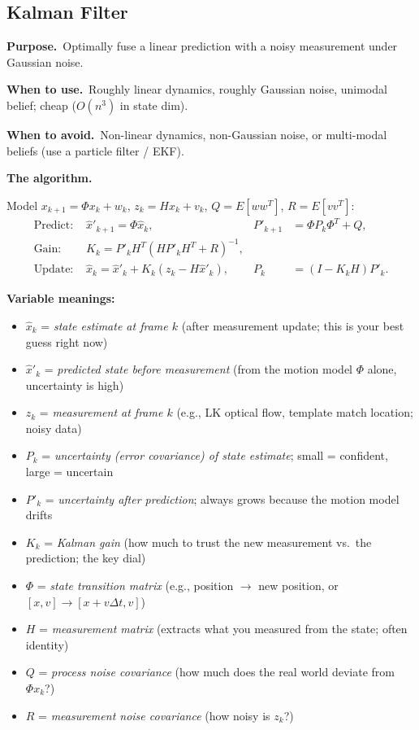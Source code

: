\documentclass[10pt]{article}
\newcommand{\Purpose}{\par\smallskip\textbf{Purpose.}\ }
\newcommand{\WhenUse}{\par\textbf{When to use.}\ }
\newcommand{\WhenAvoid}{\par\textbf{When to avoid.}\ }
\newcommand{\TheAlgo}{\par\smallskip\textbf{The algorithm.}\par\nopagebreak}
\begin{document}
\subsection{Kalman Filter}\label{sub:kalman}
\Purpose Optimally fuse a linear prediction with a noisy measurement under Gaussian noise.
\WhenUse Roughly linear dynamics, roughly Gaussian noise, unimodal belief; cheap ($O(n^3)$ in state dim).
\WhenAvoid Non-linear dynamics, non-Gaussian noise, or multi-modal beliefs (use a particle filter / EKF).
\TheAlgo Model $x_{k+1}=\Phi x_k+w_k$, $z_k=Hx_k+v_k$, $Q=E[ww^T]$, $R=E[vv^T]$:
\begin{align*}
\text{Predict: } &\hat x'_{k+1}=\Phi\hat x_k, & P'_{k+1}&=\Phi P_k\Phi^T+Q,\\
\text{Gain: } &K_k=P'_kH^T(HP'_kH^T+R)^{-1}, &&\\
\text{Update: } &\hat x_k=\hat x'_k+K_k(z_k-H\hat x'_k), & P_k&=(I-K_kH)P'_k .
\end{align*}

\textbf{Variable meanings:}
\begin{itemize}[noitemsep]
  \item $\hat x_k$ = \textit{state estimate at frame $k$} (after measurement update; this is your best guess right now)
  \item $\hat x'_k$ = \textit{predicted state before measurement} (from the motion model $\Phi$ alone, uncertainty is high)
  \item $z_k$ = \textit{measurement at frame $k$} (e.g., LK optical flow, template match location; noisy data)
  \item $P_k$ = \textit{uncertainty (error covariance) of state estimate}; small = confident, large = uncertain
  \item $P'_k$ = \textit{uncertainty after prediction}; always grows because the motion model drifts
  \item $K_k$ = \textit{Kalman gain} (how much to trust the new measurement vs.\ the prediction; the key dial)
  \item $\Phi$ = \textit{state transition matrix} (e.g., position $\to$ new position, or $[x, v] \to [x+v\Delta t, v]$)
  \item $H$ = \textit{measurement matrix} (extracts what you measured from the state; often identity)
  \item $Q$ = \textit{process noise covariance} (how much does the real world deviate from $\Phi x_k$?)
  \item $R$ = \textit{measurement noise covariance} (how noisy is $z_k$?)
\end{itemize}
\end{document}
